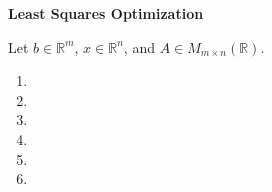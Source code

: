 \textbf{Least Squares Optimization}

Let $b \in \mathbb{R}^m$, $x \in \mathbb{R}^n$, and $A \in M_{m \times n}(\mathbb{R})$.

\begin{enumerate}
    \item 
    \pagebreak
    \item 
    \pagebreak
    \item 
    \pagebreak
    \item 
    \pagebreak
    \item 
    \pagebreak
    \item 
\end{enumerate}